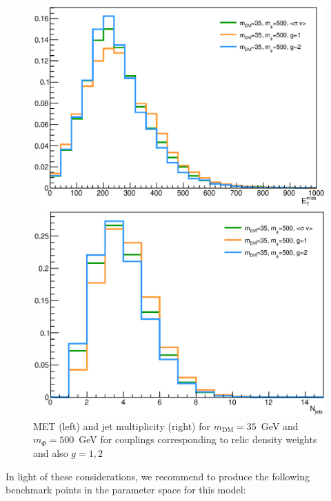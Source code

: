 \begin{figure}[h!]
    \begin{minipage}{0.49\textwidth}
      \centering 
      \includegraphics[scale=0.32]{figures/bFDM/bfdm_35_500/missing_et.eps}
    \end{minipage}
    \hfill
    \begin{minipage}{0.49\textwidth}
      \centering 
      \includegraphics[scale=0.32]{figures/bFDM/bfdm_35_500/Njets.eps}
    \end{minipage}
    \caption{MET (left) and jet multiplicity (right) for $m_\textrm{DM}=35$~GeV and $m_\Phi=500$~GeV for couplings corresponding to relic density weights and also $g=1,2$ \label{fig:g_comp}}
\end{figure}

In light of these considerations, we recommend to produce the following benchmark points in the parameter space for this model:~

